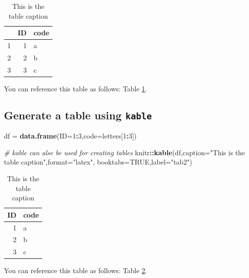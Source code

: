 \documentclass[12pt,halfline,a4paper,]{ouparticle}
\newenvironment{Shaded}{\begin{snugshade}}{\end{snugshade}}
\newcommand{\CommentTok}[1]{\textcolor[rgb]{0.56,0.35,0.01}{\textit{#1}}}
\newcommand{\DataTypeTok}[1]{\textcolor[rgb]{0.13,0.29,0.53}{#1}}
\newcommand{\DecValTok}[1]{\textcolor[rgb]{0.00,0.00,0.81}{#1}}
\newcommand{\KeywordTok}[1]{\textcolor[rgb]{0.13,0.29,0.53}{\textbf{#1}}}
\newcommand{\NormalTok}[1]{#1}
\newcommand{\OperatorTok}[1]{\textcolor[rgb]{0.81,0.36,0.00}{\textbf{#1}}}
\newcommand{\OtherTok}[1]{\textcolor[rgb]{0.56,0.35,0.01}{#1}}
\newcommand{\StringTok}[1]{\textcolor[rgb]{0.31,0.60,0.02}{#1}}
\begin{document}
\begin{table}[ht]
\centering
\begin{tabular}{rrl}
  \hline
 & ID & code \\ 
  \hline
1 &   1 & a \\ 
  2 &   2 & b \\ 
  3 &   3 & c \\ 
   \hline
\end{tabular}
\caption{This is the table caption} 
\label{tab:tab1}
\end{table}

You can reference this table as follows: Table \ref{tab:tab1}.

\hypertarget{generate-a-table-using-kable}{%
\subsection{\texorpdfstring{Generate a table using \texttt{kable}}{Generate a table using kable}}\label{generate-a-table-using-kable}}

\begin{Shaded}
\begin{Highlighting}[]
\NormalTok{df =}\StringTok{ }\KeywordTok{data.frame}\NormalTok{(}\DataTypeTok{ID=}\DecValTok{1}\OperatorTok{:}\DecValTok{3}\NormalTok{,}\DataTypeTok{code=}\NormalTok{letters[}\DecValTok{1}\OperatorTok{:}\DecValTok{3}\NormalTok{])}

\CommentTok{\# kable can alse be used for creating tables}
\NormalTok{knitr}\OperatorTok{::}\KeywordTok{kable}\NormalTok{(df,}\DataTypeTok{caption=}\StringTok{"This is the table caption"}\NormalTok{,}\DataTypeTok{format=}\StringTok{"latex"}\NormalTok{,}
             \DataTypeTok{booktabs=}\OtherTok{TRUE}\NormalTok{,}\DataTypeTok{label=}\StringTok{"tab2"}\NormalTok{)}
\end{Highlighting}
\end{Shaded}

\begin{table}

\caption{\label{tab:tab2}This is the table caption}
\centering
\begin{tabular}[t]{rl}
\toprule
ID & code\\
\midrule
1 & a\\
2 & b\\
3 & c\\
\bottomrule
\end{tabular}
\end{table}

You can reference this table as follows: Table \ref{tab:tab2}.
\end{document}
